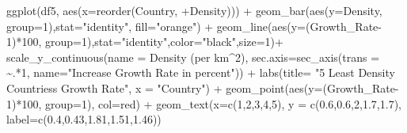 \documentclass[
]{article}
\newenvironment{Shaded}{\begin{snugshade}}{\end{snugshade}}
\newcommand{\AttributeTok}[1]{\textcolor[rgb]{0.77,0.63,0.00}{#1}}
\newcommand{\DecValTok}[1]{\textcolor[rgb]{0.00,0.00,0.81}{#1}}
\newcommand{\FloatTok}[1]{\textcolor[rgb]{0.00,0.00,0.81}{#1}}
\newcommand{\FunctionTok}[1]{\textcolor[rgb]{0.00,0.00,0.00}{#1}}
\newcommand{\NormalTok}[1]{#1}
\newcommand{\SpecialCharTok}[1]{\textcolor[rgb]{0.00,0.00,0.00}{#1}}
\newcommand{\StringTok}[1]{\textcolor[rgb]{0.31,0.60,0.02}{#1}}
\begin{document}
\begin{Shaded}
\begin{Highlighting}[]
\FunctionTok{ggplot}\NormalTok{(df5, }\FunctionTok{aes}\NormalTok{(}\AttributeTok{x=}\FunctionTok{reorder}\NormalTok{(Country, }\SpecialCharTok{+}\NormalTok{Density)))  }\SpecialCharTok{+} 
  \FunctionTok{geom\_bar}\NormalTok{(}\FunctionTok{aes}\NormalTok{(}\AttributeTok{y=}\NormalTok{Density, }\AttributeTok{group=}\DecValTok{1}\NormalTok{),}\AttributeTok{stat=}\StringTok{"identity"}\NormalTok{, }\AttributeTok{fill=}\StringTok{"orange"}\NormalTok{) }\SpecialCharTok{+}
  \FunctionTok{geom\_line}\NormalTok{(}\FunctionTok{aes}\NormalTok{(}\AttributeTok{y=}\NormalTok{(Growth\_Rate}\DecValTok{{-}1}\NormalTok{)}\SpecialCharTok{*}\DecValTok{100}\NormalTok{, }\AttributeTok{group=}\DecValTok{1}\NormalTok{),}\AttributeTok{stat=}\StringTok{"identity"}\NormalTok{,}\AttributeTok{color=}\StringTok{"black"}\NormalTok{,}\AttributeTok{size=}\DecValTok{1}\NormalTok{)}\SpecialCharTok{+}
  \FunctionTok{scale\_y\_continuous}\NormalTok{(}\AttributeTok{name =} \StringTok{\textquotesingle{}Density (per km\^{}2)\textquotesingle{}}\NormalTok{, }\AttributeTok{sec.axis=}\FunctionTok{sec\_axis}\NormalTok{(}\AttributeTok{trans =} \SpecialCharTok{\textasciitilde{}}\NormalTok{.}\SpecialCharTok{*}\DecValTok{1}\NormalTok{, }\AttributeTok{name=}\StringTok{"Increase Growth Rate in percent"}\NormalTok{)) }\SpecialCharTok{+}
  \FunctionTok{labs}\NormalTok{(}\AttributeTok{title=} \StringTok{"5 Least Density Countries\textquotesingle{}s Growth Rate"}\NormalTok{, }\AttributeTok{x =} \StringTok{"Country"}\NormalTok{) }\SpecialCharTok{+}
  \FunctionTok{geom\_point}\NormalTok{(}\FunctionTok{aes}\NormalTok{(}\AttributeTok{y=}\NormalTok{(Growth\_Rate}\DecValTok{{-}1}\NormalTok{)}\SpecialCharTok{*}\DecValTok{100}\NormalTok{, }\AttributeTok{group=}\DecValTok{1}\NormalTok{), }\AttributeTok{col=}\StringTok{\textquotesingle{}red\textquotesingle{}}\NormalTok{) }\SpecialCharTok{+}
  \FunctionTok{geom\_text}\NormalTok{(}\AttributeTok{x=}\FunctionTok{c}\NormalTok{(}\DecValTok{1}\NormalTok{,}\DecValTok{2}\NormalTok{,}\DecValTok{3}\NormalTok{,}\DecValTok{4}\NormalTok{,}\DecValTok{5}\NormalTok{), }\AttributeTok{y =} \FunctionTok{c}\NormalTok{(}\FloatTok{0.6}\NormalTok{,}\FloatTok{0.6}\NormalTok{,}\DecValTok{2}\NormalTok{,}\FloatTok{1.7}\NormalTok{,}\FloatTok{1.7}\NormalTok{), }\AttributeTok{label=}\FunctionTok{c}\NormalTok{(}\FloatTok{0.4}\NormalTok{,}\FloatTok{0.43}\NormalTok{,}\FloatTok{1.81}\NormalTok{,}\FloatTok{1.51}\NormalTok{,}\FloatTok{1.46}\NormalTok{))}
\end{Highlighting}
\end{Shaded}
\end{document}

